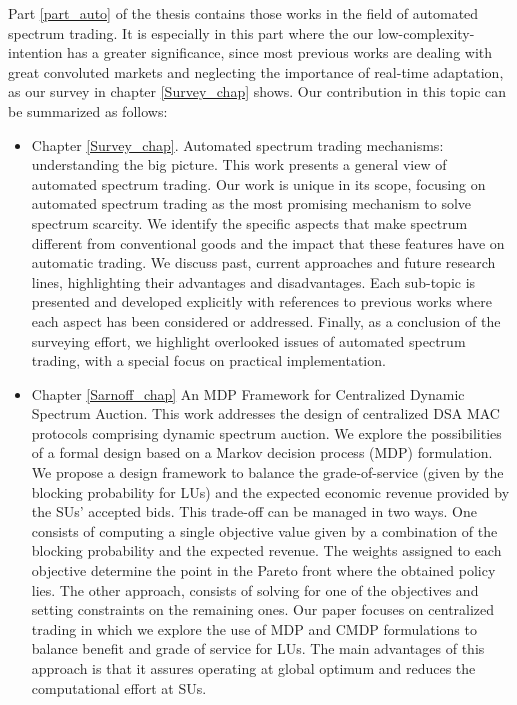 Part \ref{part_auto} of the thesis contains those works in the field of automated spectrum trading. 
It is especially in this part where the our low-complexity-intention has a greater significance, since most previous works are dealing with great convoluted markets and neglecting the importance of real-time adaptation, as our survey in chapter \ref{Survey_chap} shows. 
Our contribution in this topic can be summarized as follows:
\begin{itemize}
\item Chapter \ref{Survey_chap}. Automated spectrum trading mechanisms: understanding the big picture.
This work presents a general view of automated spectrum trading.
Our work is unique in its scope, focusing on automated spectrum trading as the most promising mechanism to solve spectrum scarcity.
We identify the specific aspects that make spectrum different from conventional goods and the impact that these features have on automatic trading.
We discuss past, current approaches and future research lines, highlighting their advantages and disadvantages. 
Each sub-topic is presented and developed explicitly with references to previous works where each aspect has been considered or addressed.
Finally, as a conclusion of the surveying effort, we highlight overlooked issues of automated spectrum trading, with a special focus on practical implementation.
\item Chapter \ref{Sarnoff_chap} An MDP Framework for Centralized Dynamic Spectrum Auction.
This work addresses the design of centralized DSA MAC protocols comprising dynamic spectrum auction. We explore the possibilities of a formal design based on a Markov decision process (MDP) formulation. We propose a design framework to balance the grade-of-service (given by the blocking probability for LUs) and the expected economic revenue provided by the SUs' accepted bids. 
This trade-off can be managed in two ways. One consists of computing a single objective value given by a combination of the blocking probability and the expected revenue. 
The weights assigned to each objective determine the point in the Pareto front where the obtained policy lies. The other approach, consists of solving for one of the objectives and setting constraints on the remaining ones.
Our paper focuses on centralized trading in which we explore the use of MDP and CMDP formulations to balance benefit and grade of service for LUs. 
The main advantages of this approach is that it assures operating at global optimum and reduces the computational effort at SUs.

\end{itemize}
